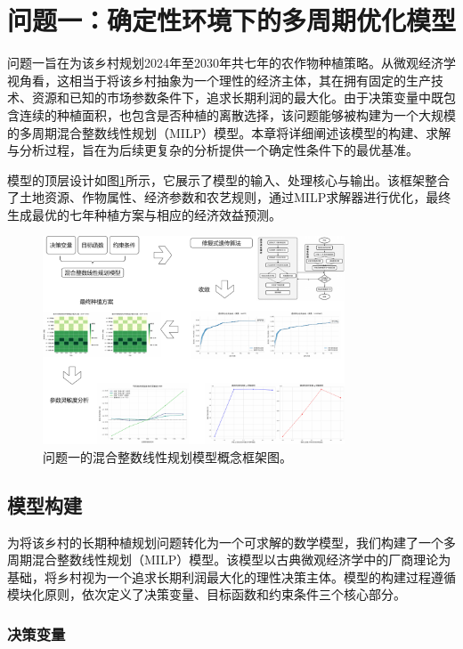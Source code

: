 \section{问题一：确定性环境下的多周期优化模型}

问题一旨在为该乡村规划2024年至2030年共七年的农作物种植策略。从微观经济学视角看，这相当于将该乡村抽象为一个理性的经济主体，其在拥有固定的生产技术、资源和已知的市场参数条件下，追求长期利润的最大化\cite{SYCG202521003}。由于决策变量中既包含连续的种植面积，也包含是否种植的离散选择，该问题能够被构建为一个大规模的多周期混合整数线性规划（MILP）模型\cite{DLKC202405001}。本章将详细阐述该模型的构建、求解与分析过程，旨在为后续更复杂的分析提供一个确定性条件下的最优基准。

模型的顶层设计如图\ref{fig:milp_framework}所示，它展示了模型的输入、处理核心与输出。该框架整合了土地资源、作物属性、经济参数和农艺规则，通过MILP求解器进行优化，最终生成最优的七年种植方案与相应的经济效益预测。

\begin{figure}[htbp]
    \centering
    \includegraphics[width=0.8\textwidth]{figs/3问题一/问题一框架.pdf}
    \caption{问题一的混合整数线性规划模型概念框架图。}
    \label{fig:milp_framework}
\end{figure}

\subsection{模型构建}


为将该乡村的长期种植规划问题转化为一个可求解的数学模型，我们构建了一个多周期混合整数线性规划（MILP）模型。该模型以古典微观经济学中的厂商理论为基础，将乡村视为一个追求长期利润最大化的理性决策主体。模型的构建过程遵循模块化原则，依次定义了决策变量、目标函数和约束条件三个核心部分。

\subsubsection{决策变量}

